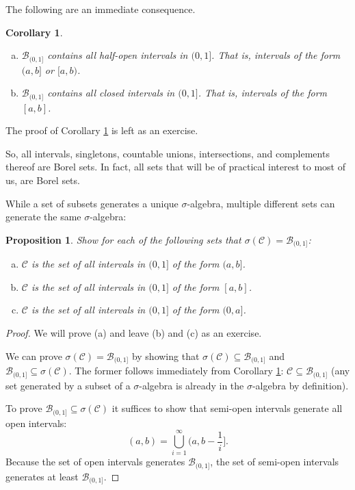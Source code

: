 \documentclass{book}
\theoremstyle{plain}%
\newtheorem{corollary}{Corollary}[section]
\newtheorem{proposition}{Proposition}[section]
\theoremstyle{definition}
\begin{document}
The following are an immediate consequence.

\begin{corollary}
\text{ }
\begin{enumerate}[(a)]
\item $\mathcal{B}_{(0,1]}$ contains all half-open intervals in $(0,1]$. That is, intervals of the form $(a,b]$ or $[a,b)$.
\item $\mathcal{B}_{(0,1]}$ contains all closed intervals in $(0,1]$. That is, intervals of the form $[a,b]$.
\end{enumerate}
\label{prop:borel_sets}
\end{corollary}

The proof of Corollary \ref{prop:borel_sets} is left as an exercise.

So, all intervals, singletons, countable unions, intersections, and complements thereof are Borel sets. In fact, all sets that will be of practical interest to most of us, are Borel sets.

While a set of subsets generates a unique $\sigma$-algebra, multiple different sets can generate the same $\sigma$-algebra:


\begin{proposition}
Show for each of the following sets that $\sigma(\mathcal{C}) = \mathcal{B}_{(0,1]}$:
\begin{enumerate}[(a)]
\item $\mathcal{C}$ is the set of all intervals in $(0,1]$ of the form $(a,b]$.
\item $\mathcal{C}$ is the set of all intervals in $(0,1]$ of the form $[a,b]$.
\item $\mathcal{C}$ is the set of all intervals in $(0,1]$ of the form $(0,a]$.
\end{enumerate}\label{prop:generateborel}
\end{proposition}

\begin{proof}
We will prove (a) and leave (b) and (c) as an exercise.

We can prove $\sigma(\mathcal{C}) = \mathcal{B}_{(0,1]}$ by showing that $\sigma(\mathcal{C}) \subseteq \mathcal{B}_{(0,1]}$ and $\mathcal{B}_{(0,1]} \subseteq \sigma(\mathcal{C})$. The former follows immediately from Corollary \ref{prop:borel_sets}: $\mathcal{C} \subseteq \mathcal{B}_{(0,1]}$ (any set generated by a subset of a $\sigma$-algebra is already in the $\sigma$-algebra by definition).

To prove $\mathcal{B}_{(0,1]} \subseteq \sigma(\mathcal{C})$ it suffices to show that semi-open intervals generate all open intervals:
$$(a,b) = \displaystyle\bigcup_{i=1}^\infty (a,b-\frac{1}{i}].$$
Because the set of open intervals generates $\mathcal{B}_{(0,1]}$, the set of semi-open intervals generates at least $\mathcal{B}_{(0,1]}$.
\end{proof}
\end{document}
